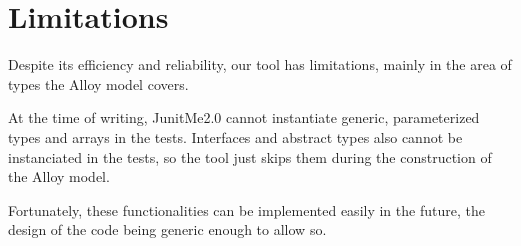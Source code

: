 \section{Limitations}
	Despite its efficiency and reliability, our tool has limitations, mainly in the area of types the Alloy model covers.
	
	At the time of writing, JunitMe2.0 cannot instantiate generic, parameterized types and arrays in the tests.
	Interfaces and abstract types also cannot be instanciated in the tests, so the tool just skips them during the construction of the Alloy model.
	
	Fortunately, these functionalities can be implemented easily in the future, the design of the code being generic enough to allow so.